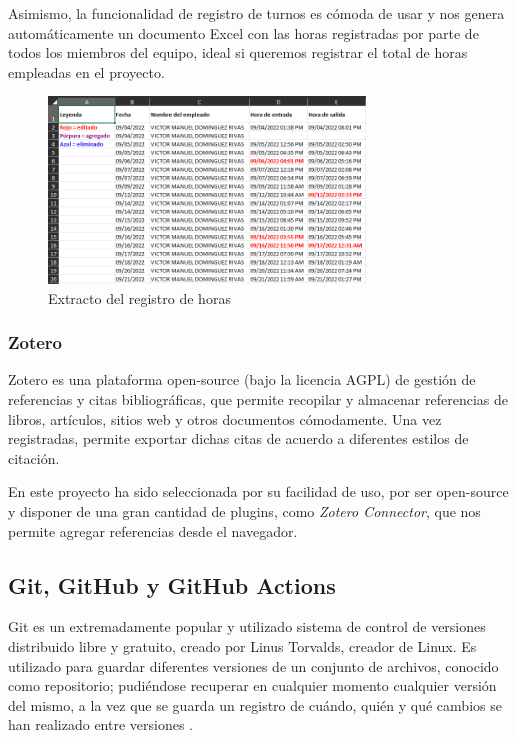             Asimismo, la funcionalidad de registro de turnos es cómoda de usar y nos genera automáticamente un documento
            Excel con las horas registradas por parte de todos los miembros del equipo, ideal si queremos registrar el 
            total de horas empleadas en el proyecto. 

            \begin{figure}[h!]
                \centering
                \includegraphics[width=0.75\textwidth]{figures/Teams excel.PNG}
                \caption{Extracto del registro de horas}
                \label{fig:teams:excel}
            \end{figure}
        

        \subsubsection{Zotero}
            Zotero es una plataforma open-source (bajo la licencia AGPL) de gestión de referencias y citas 
            bibliográficas, que permite recopilar y almacenar referencias de libros, artículos, sitios web y otros 
            documentos cómodamente. Una vez registradas, permite exportar dichas citas de acuerdo a diferentes estilos 
            de citación. 
                
            En este proyecto ha sido seleccionada por su facilidad de uso, por ser open-source y disponer de una gran 
            cantidad de plugins, como \textit{Zotero Connector}, que nos permite agregar referencias desde el navegador.
        
        \subsection{Git, GitHub y GitHub Actions}
            Git es un extremadamente popular y utilizado sistema de control de versiones distribuido libre y gratuito,
            creado por Linus Torvalds, creador de Linux. Es utilizado para guardar diferentes versiones
            de un conjunto de archivos, conocido como repositorio; pudiéndose recuperar en cualquier momento
            cualquier versión del mismo, a la vez que se guarda un registro de cuándo, quién y qué cambios se han 
            realizado entre versiones \cite{atlassian_software_nodate}.

